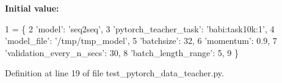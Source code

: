 {\bfseries Initial value\+:}
\begin{DoxyCode}
1 =  \{
2     \textcolor{stringliteral}{'model'}: \textcolor{stringliteral}{'seq2seq'},
3     \textcolor{stringliteral}{'pytorch\_teacher\_task'}: \textcolor{stringliteral}{'babi:task10k:1'},
4     \textcolor{stringliteral}{'model\_file'}: \textcolor{stringliteral}{'/tmp/tmp\_model'},
5     \textcolor{stringliteral}{'batchsize'}: 32,
6     \textcolor{stringliteral}{'momentum'}: 0.9,
7     \textcolor{stringliteral}{'validation\_every\_n\_secs'}: 30,
8     \textcolor{stringliteral}{'batch\_length\_range'}: 5,
9 \}
\end{DoxyCode}


Definition at line 19 of file test\+\_\+pytorch\+\_\+data\+\_\+teacher.\+py.

